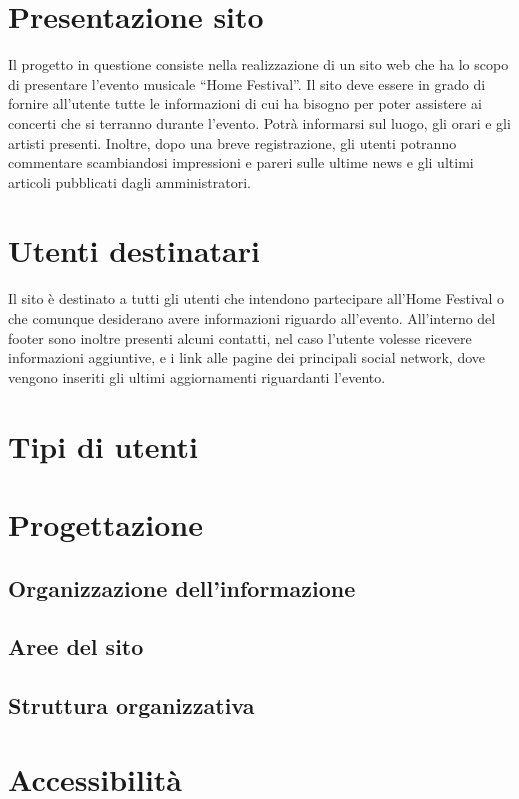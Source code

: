 \documentclass[10pt, a4paper]{article}
\begin{document}
\newpage
\hypersetup{hidelinks}
\tableofcontents
\newpage







\section{Presentazione sito}
Il progetto in questione consiste nella realizzazione di un sito web che ha lo scopo di presentare l’evento musicale “Home Festival”. Il sito deve essere in grado di fornire all’utente tutte le informazioni di cui ha bisogno per poter assistere ai concerti che si terranno durante l’evento. Potrà informarsi sul luogo, gli orari e gli artisti presenti.
Inoltre, dopo una breve registrazione, gli utenti potranno commentare scambiandosi impressioni e pareri sulle ultime news e gli ultimi articoli pubblicati dagli amministratori.

\section{Utenti destinatari}
Il sito è destinato a tutti gli utenti che intendono partecipare all’Home Festival o che comunque desiderano avere informazioni riguardo all’evento.  
All’interno del footer sono inoltre presenti alcuni contatti, nel caso l’utente volesse ricevere informazioni aggiuntive, e i link alle pagine dei principali social network, dove vengono inseriti gli ultimi aggiornamenti riguardanti l’evento.

\section{Tipi di utenti}
\section{Progettazione}
\subsection{Organizzazione dell'informazione}
\subsection{Aree del sito}
\subsection{Struttura organizzativa}
\section{Accessibilità}
\end{document}

